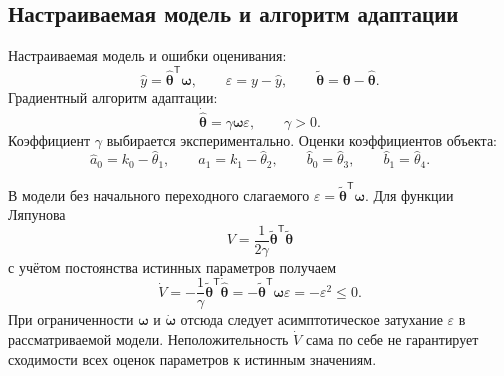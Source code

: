 \subsection{Настраиваемая модель и алгоритм адаптации}

Настраиваемая модель и ошибки оценивания:
\begin{equation}
  \hat y=\hat{\bm\theta}^{\mathsf T}\bm\omega,
  \qquad
  \varepsilon=y-\hat y,
  \qquad
  \tilde{\bm\theta}=\bm\theta-\hat{\bm\theta}.
  \label{eq:adjustable-model}
\end{equation}
Градиентный алгоритм адаптации:
\begin{equation}
  \dot{\hat{\bm\theta}}=\gamma\bm\omega\varepsilon,
  \qquad \gamma>0.
  \label{eq:adaptation}
\end{equation}
Коэффициент $\gamma$ выбирается экспериментально.
Оценки коэффициентов объекта:
\begin{equation}
  \hat a_0=k_0-\hat\theta_1,\qquad
  \hat a_1=k_1-\hat\theta_2,\qquad
  \hat b_0=\hat\theta_3,\qquad
  \hat b_1=\hat\theta_4.
\end{equation}

В модели без начального переходного слагаемого
$\varepsilon=\tilde{\bm\theta}^{\mathsf T}\bm\omega$.
Для функции Ляпунова
\begin{equation}
  V=\frac{1}{2\gamma}
  \tilde{\bm\theta}^{\mathsf T}\tilde{\bm\theta}
\end{equation}
с учётом постоянства истинных параметров получаем
\begin{equation}
  \dot V
  =-\frac{1}{\gamma}
    \tilde{\bm\theta}^{\mathsf T}\dot{\hat{\bm\theta}}
  =-\tilde{\bm\theta}^{\mathsf T}\bm\omega\varepsilon
  =-\varepsilon^2\le0.
  \label{eq:lyapunov-derivative}
\end{equation}
При ограниченности $\bm\omega$ и $\dot{\bm\omega}$ отсюда следует
асимптотическое затухание $\varepsilon$ в рассматриваемой модели.
Неположительность $\dot V$ сама по себе не гарантирует
сходимости всех оценок параметров к истинным значениям.

